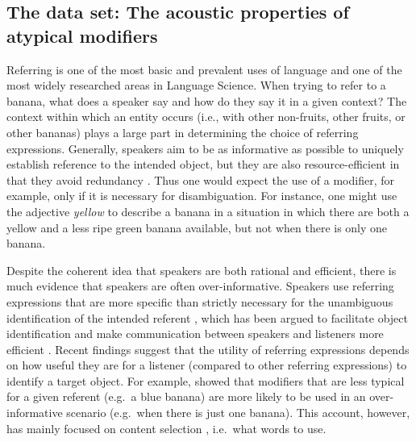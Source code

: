 \documentclass[Review,times,sageh]{sagej}
\begin{document}
\hypertarget{s:dataset}{%
\subsection{The data set: The acoustic properties of atypical modifiers}\label{s:dataset}}

Referring is one of the most basic and prevalent uses of language and one of the most widely researched areas in Language Science.
When trying to refer to a banana, what does a speaker say and how do they say it in a given context?
The context within which an entity occurs (i.e., with other non-fruits, other fruits, or other bananas) plays a large part in determining the choice of referring expressions.
Generally, speakers aim to be as informative as possible to uniquely establish reference to the intended object, but they are also resource-efficient in that they avoid redundancy \citep{grice1975logic}.
Thus one would expect the use of a modifier, for example, only if it is necessary for disambiguation.
For instance, one might use the adjective \emph{yellow} to describe a banana in a situation in which there are both a yellow and a less ripe green banana available, but not when there is only one banana.

Despite the coherent idea that speakers are both rational and efficient, there is much evidence that speakers are often over-informative.
Speakers use referring expressions that are more specific than strictly necessary for the unambiguous identification of the intended referent \citep{sedivy2003pragmatic, rubio2016redundant}, which has been argued to facilitate object identification and make communication between speakers and listeners more efficient \citep{arts2011overspecification, paraboni2007generating, rubio2016redundant}.
Recent findings suggest that the utility of referring expressions depends on how useful they are for a listener (compared to other referring expressions) to identify a target object.
For example, \citet{degen2020redundancy} showed that modifiers that are less typical for a given referent (e.g.~a blue banana) are more likely to be used in an over-informative scenario (e.g.~when there is just one banana)\citep[see also][]{westerbeek2015stored}.
This account, however, has mainly focused on content selection \citep{gatt2013we}, i.e.~what words to use.
\end{document}
